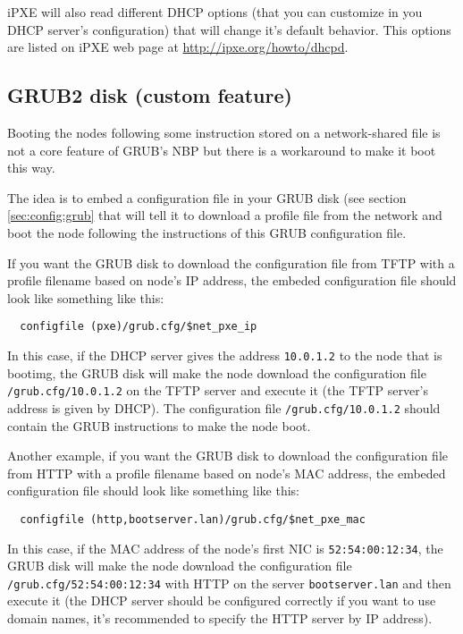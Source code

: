 \documentclass[a4paper,11pt]{article}
\begin{document}
iPXE will also read different DHCP options (that you can customize in you DHCP server's configuration) that will change it's default behavior. This options are listed on iPXE web page at \url{http://ipxe.org/howto/dhcpd}.


\subsection{GRUB2 disk (custom feature)}
Booting the nodes following some instruction stored on a network-shared file is not a core feature of GRUB's NBP but there is a workaround to make it boot this way.

The idea is to embed a configuration file in your GRUB disk (see section \ref{sec:config:grub} that will tell it to download a profile file from the network and boot the node following the instructions of this GRUB configuration file.

If you want the GRUB disk to download the configuration file from TFTP with a profile filename based on node's IP address, the embeded configuration file should look like something like this:
\begin{verbatim}
  configfile (pxe)/grub.cfg/$net_pxe_ip
\end{verbatim}
In this case, if the DHCP server gives the address \texttt{10.0.1.2} to the node that is bootimg, the GRUB disk will make the node download the configuration file \texttt{/grub.cfg/10.0.1.2} on the TFTP server and execute it (the TFTP server's address is given by DHCP). The configuration file \texttt{/grub.cfg/10.0.1.2} should contain the GRUB instructions to make the node boot.

Another example, if you want the GRUB disk to download the configuration file from HTTP with a profile filename based on node's MAC address, the embeded configuration file should look like something like this:
\begin{verbatim}
  configfile (http,bootserver.lan)/grub.cfg/$net_pxe_mac
\end{verbatim}
In this case, if the MAC address of the node's first NIC is \texttt{52:54:00:12:34}, the GRUB disk will make the node download the configuration file \texttt{/grub.cfg/52:54:00:12:34} with HTTP on the server \texttt{bootserver.lan} and then execute it (the DHCP server should be configured correctly if you want to use domain names, it's recommended to specify the HTTP server by IP address).
\end{document}
